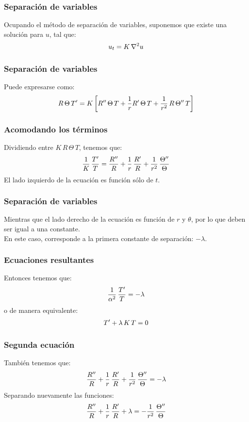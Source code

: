 \documentclass[12pt]{beamer}
\begin{document}
\begin{frame}
\frametitle{Separación de variables}
Ocupando el método de separación de variables, suponemos que existe una solución para $u$, tal que:
\pause
\begin{align*}
u_{t} = K \, \laplacian{u}
\end{align*}
\end{frame}
\begin{frame}[fragile]
\frametitle{Separación de variables}
Puede expresarse como:
\pause
\begin{align*}
R \, \Theta \, {T}^{\prime} = K \, \bigg[ {R}^{\prime \prime} \, \Theta \, T + \dfrac{1}{r} {R}^{\prime} \, \Theta \, T + \dfrac{1}{r^{2}} \, R \, {\Theta}^{\prime \prime} \, T \bigg]
\end{align*}
\end{frame}
\begin{frame}
\frametitle{Acomodando los términos}
Dividiendo entre $K \, R \, \Theta \, T $, tenemos que:
\pause
\begin{align}
\dfrac{1}{K} \, \dfrac{{T}^{\prime}}{T} = \dfrac{{R}^{\prime \prime}}{R} + \dfrac{1}{r} \, \dfrac{{R}^{\prime}}{R} + \dfrac{1}{r^{2}} \, \dfrac{{\Theta}^{\prime \prime}}{\Theta}
\label{eq:ecuacion_K01}
\end{align}
\pause
El lado izquierdo de la ecuación es función sólo de $t$.
\end{frame}
\begin{frame}
\frametitle{Separación de variables}
Mientras que el lado derecho de la ecuación es función de $r$ y $\theta$, por lo que deben ser igual a una constante.
\\
\bigskip
\pause
En este caso, corresponde a la primera constante de separación: $- \lambda$.
\end{frame}
\begin{frame}
\frametitle{Ecuaciones resultantes}
Entonces tenemos que:
\pause
\begin{align*}
\dfrac{1}{\alpha^{2}} \, \dfrac{{T}^{\prime}}{T} = - \lambda
\end{align*}
o de manera equivalente:
\pause
\begin{align}
{T}^{\prime} + \lambda \, K \, T = 0
\label{eq:ecuacion_K02}    
\end{align}
\end{frame}
\begin{frame}
\frametitle{Segunda ecuación}
También tenemos que:
\pause
\begin{align*}
\dfrac{{R}^{\prime \prime}}{R} + \dfrac{1}{r} \, \dfrac{{R}^{\prime}}{R} + \dfrac{1}{r^{2}} \, \dfrac{{\Theta}^{\prime \prime}}{\Theta} = - \lambda
\end{align*}
\pause
Separando nuevamente las funciones:
\pause
\begin{align*}
\dfrac{{R}^{\prime \prime}}{R} + \dfrac{1}{r} \, \dfrac{{R}^{\prime}}{R} + \lambda = - \dfrac{1}{r^{2}} \, \dfrac{{\Theta}^{\prime \prime}}{\Theta}
\end{align*}
\end{frame}
\end{document}
